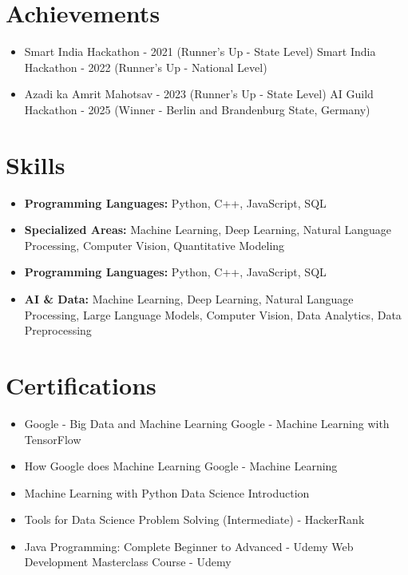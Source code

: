 \documentclass[a4paper,10pt]{article}
\begin{document}
\section*{Achievements}
\begin{itemize}
\item Smart India Hackathon - 2021 (Runner's Up - State Level) \hfill Smart India Hackathon - 2022 (Runner's Up - National Level)
\item Azadi ka Amrit Mahotsav - 2023 (Runner's Up - State Level) \hfill AI Guild Hackathon - 2025 (Winner - Berlin and Brandenburg State, Germany)
\end{itemize}

\section*{Skills}
\begin{itemize}
  \item \textbf{Programming Languages:} Python, C++, JavaScript, SQL
  \item \textbf{Specialized Areas:} Machine Learning, Deep Learning, Natural Language Processing, Computer Vision, Quantitative Modeling
  \item \textbf{Programming Languages:} Python, C++, JavaScript, SQL
  \item \textbf{AI \& Data:} Machine Learning, Deep Learning, Natural Language Processing, Large Language Models, Computer Vision, Data Analytics, Data Preprocessing
\end{itemize}

\section*{Certifications}
\begin{itemize}
\item Google - Big Data and Machine Learning \hfill Google - Machine Learning with TensorFlow
\item How Google does Machine Learning \hfill Google - Machine Learning
\item Machine Learning with Python \hfill Data Science Introduction
\item Tools for Data Science \hfill Problem Solving (Intermediate) - HackerRank
\item Java Programming: Complete Beginner to Advanced - Udemy \hfill Web Development Masterclass Course - Udemy
\end{itemize}
\end{document}
